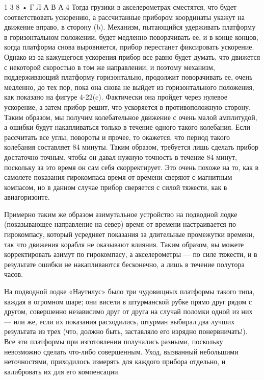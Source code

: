 \documentclass[10pt,oneside]{article}
\begin{document}
1 3 8 • Г Л А В А  4 Тогда грузики в акселерометрах сместятся, что будет соответствовать ускорению, а рассчитанные прибором координаты укажут на движение вправо, в сторону (b). Механизм, пытающийся удерживать платформу в горизонтальном положении, будет медленно поворачивать ее, и в конце концов, когда платформа снова выровняется, прибор перестанет фиксировать ускорение. Однако из-за кажущегося ускорения прибор все равно будет думать, что движется с некоторой скоростью в том же направлении, и поэтому механизм, поддерживающий платформу горизонтально, продолжит поворачивать ее, очень медленно, до тех пор, пока она снова не выйдет из горизонтального положения, как показано на фигуре 4-22(c). Фактически она пройдет через нулевое ускорение, а затем прибор решит, что ускоряется в противоположную сторону. Таким образом, мы получим колебательное движение с очень малой амплитудой, а ошибки будут накапливаться только в течение одного такого колебания. Если рассчитать все углы, повороты и прочее, то окажется, что период такого колебания составляет 84 минуты. Таким образом, требуется лишь сделать прибор достаточно точным, чтобы он давал нужную точность в течение 84 минут, поскольку за это время он сам себя скорректирует. Это очень похоже на то, как в самолете показания гирокомпаса время от времени сверяют с магнитным компасом, но в данном случае прибор сверяется с силой тяжести, как в авиагоризонте.\par

Примерно таким же образом азимутальное устройство на подводной лодке (показывающее направление на север) время от времени настраивается по гирокомпасу, который усредняет показания за длительные промежутки времени, так что движения корабля не оказывают влияния. Таким образом, вы можете корректировать азимут по гирокомпасу, а акселерометры --- по силе тяжести, и в результате ошибки не накапливаются бесконечно, а лишь в течение полутора часов.\par

На подводной лодке «Наутилус» было три чудовищных платформы такого типа, каждая в огромном шаре; они висели в штурманской рубке прямо друг рядом с другом, совершенно независимо друг от друга на случай поломки одной из них --- или же, если их показания расходились, штурман выбирал два лучших результата из трех (что, должно быть, заставляло его изрядно понервничать!). Все эти платформы при изготовлении получались разными, поскольку невозможно сделать что-либо совершенным. Уход, вызванный небольшими неточностями, приходилось измерять для каждого прибора отдельно, и калибровать их для его компенсации.\par
\end{document}
